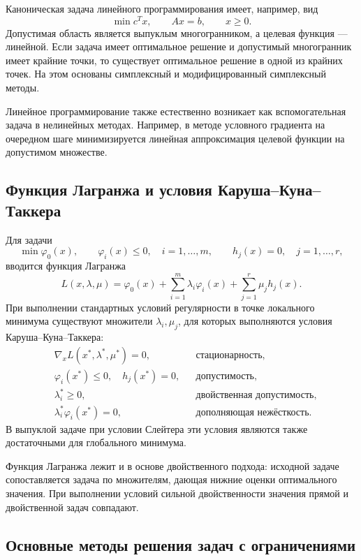 Каноническая задача линейного программирования имеет, например, вид
\[
    \min c^Tx,
    \qquad Ax=b,
    \qquad x\geq0.
\]
Допустимая область является выпуклым многогранником, а целевая функция ---
линейной. Если задача имеет оптимальное решение и допустимый многогранник имеет
крайние точки, то существует оптимальное решение в одной из крайних точек. На
этом основаны симплексный и модифицированный симплексный методы.

Линейное программирование также естественно возникает как вспомогательная задача
в нелинейных методах. Например, в методе условного градиента на очередном шаге
минимизируется линейная аппроксимация целевой функции на допустимом множестве.

\subsection{Функция Лагранжа и условия Каруша--Куна--Таккера}

Для задачи
\[
    \min \varphi_0(x),
    \qquad
    \varphi_i(x)\leq0,\quad i=1,\ldots,m,
    \qquad
    h_j(x)=0,\quad j=1,\ldots,r,
\]
вводится функция Лагранжа
\[
    L(x,\lambda,\mu)
    =\varphi_0(x)+\sum_{i=1}^m\lambda_i\varphi_i(x)
      +\sum_{j=1}^r\mu_jh_j(x).
\]
При выполнении стандартных условий регулярности в точке локального минимума
существуют множители $\lambda_i,\mu_j$, для которых выполняются условия
Каруша--Куна--Таккера:
\begin{align*}
    &\nabla_xL(x^*,\lambda^*,\mu^*)=0,
        &&\text{стационарность},\\
    &\varphi_i(x^*)\leq0,\quad h_j(x^*)=0,
        &&\text{допустимость},\\
    &\lambda_i^*\geq0,
        &&\text{двойственная допустимость},\\
    &\lambda_i^*\varphi_i(x^*)=0,
        &&\text{дополняющая нежёсткость}.
\end{align*}
В выпуклой задаче при условии Слейтера эти условия являются также достаточными
для глобального минимума.

Функция Лагранжа лежит и в основе двойственного подхода: исходной задаче
сопоставляется задача по множителям, дающая нижние оценки оптимального значения.
При выполнении условий сильной двойственности значения прямой и двойственной
задач совпадают.

\subsection{Основные методы решения задач с ограничениями}

